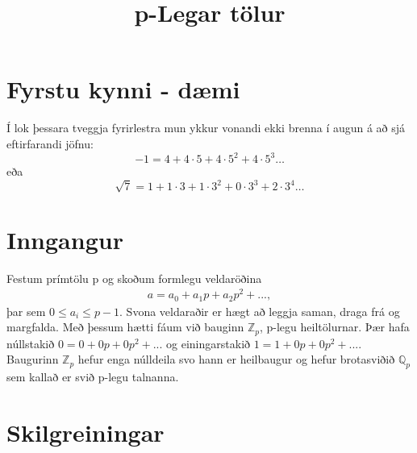 
\title{p-Legar tölur}

\maketitle
\section*{Fyrstu kynni - dæmi}
Í lok þessara tveggja fyrirlestra mun ykkur vonandi ekki brenna í augun á að sjá eftirfarandi jöfnu:
\begin{equation*}
-1 = 4 + 4\cdot 5+4\cdot 5^2+4\cdot 5^3 \ldots
\end{equation*}
eða 
\begin{equation*}
\sqrt{7} = 1 + 1\cdot 3 + 1\cdot 3^2+0\cdot 3^3+2\cdot 3^4 \ldots
\end{equation*}

\section*{Inngangur}
Festum prímtölu p og skoðum formlegu veldaröðina
\begin{align*}
a = a_0 + a_1 p + a_2 p^2 + ...,
\end{align*}
þar sem $0 \leq a_i \leq p-1$. 
Svona veldaraðir er hægt að leggja saman, draga frá og margfalda.
Með þessum hætti fáum við bauginn $\mathbb{Z}_p$, p-legu heiltölurnar.
Þær hafa núllstakið $0 = 0+0p+0p^2+...$ og 
einingarstakið $1 = 1 + 0p+0p^2+...$.
\\Baugurinn $\mathbb{Z}_p$ hefur enga núlldeila svo hann er heilbaugur 
og hefur brotasviðið $\mathbb{Q}_p$ sem kallað er svið p-legu talnanna.

\section*{Skilgreiningar}




